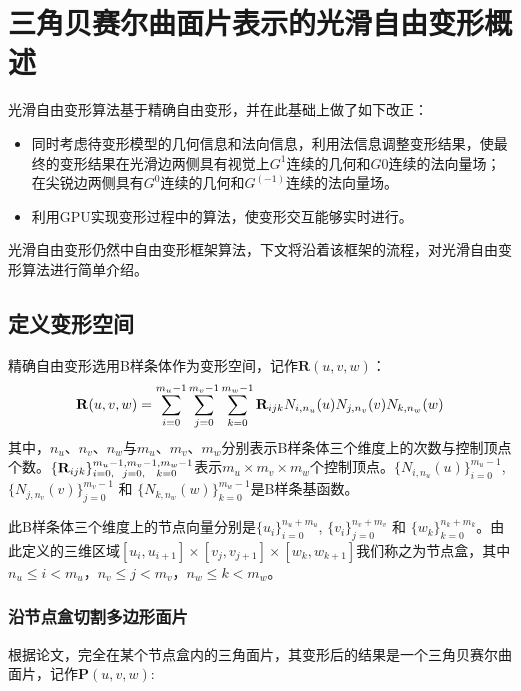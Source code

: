 
\chapter{三角贝赛尔曲面片表示的光滑自由变形概述}
光滑自由变形算法基于精确自由变形\cite{Feng98}，并在此基础上做了如下改正：

\begin{itemize}
        \item 同时考虑待变形模型的几何信息和法向信息，利用法信息调整变形结果，使最终的变形结果在光滑边两侧具有视觉上$G^1$连续的几何和$G0$连续的法向量场；在尖锐边两侧具有$G^0$连续的几何和$G^(-1)$连续的法向量场。
        \item 利用GPU实现变形过程中的算法，使变形交互能够实时进行。
\end{itemize}

光滑自由变形仍然中自由变形框架算法，下文将沿着该框架的流程，对光滑自由变形算法进行简单介绍。

\section{定义变形空间}
精确自由变形选用B样条体作为变形空间，记作$\mathbf R(u,v,w)$：
\begin{equation}
	\footnotesize
	{\mathbf R}(u,v,w) 
	= \sum_{i=0}^{m_u-1}\sum_{j=0}^{m_v-1}\sum_{k=0}^{m_w-1} {\mathbf
	R}_{ijk}N_{i,n_u}(u)N_{j,n_v}(v)N_{k,n_w}(w)
	\label{equ:Ruvw}
\end{equation}
其中，$n_u$、$n_v$、$n_w$与$m_u$、$m_v$、$m_w$分别表示B样条体三个维度上的次数与控制顶点个数。$\{\mathbf R_{ijk}\}_{i=0,\hspace{6 pt} j=0,\hspace{8 pt} k=0}^{m_u-1,m_v-1,m_w-1}$表示$m_u\times m_v\times m_w$个控制顶点。$\{N_{i,n_u}(u)\}_{i=0}^{m_u-1}$, $\{N_{j,n_v}(v)\}_{j=0}^{m_v-1}$ 和 $\{N_{k,n_w}(w)\}_{k=0}^{m_w-1}$是B样条基函数。

此B样条体三个维度上的节点向量分别是$\{u_i\}^{n_u+m_u}_{i=0}$, $\{v_i\}^{n_v+m_v}_{j=0}$ 和 $\{w_k\}^{n_k+m_k}_{k=0}$。由此定义的三维区域$[u_i, u_{i+1}] \times [v_j, v_{j+1}] \times [w_k, w_{k+1}]$我们称之为节点盒，其中$n_u\leq i < m_u$，$n_v\leq j < m_v$，$n_w\leq k < m_w$。

\subsection{沿节点盒切割多边形面片}
根据论文\cite{Feng98, Feng00}，完全在某个节点盒内的三角面片，其变形后的结果是一个三角贝赛尔曲面片，记作${\mathbf P}(u,v,w)$:\label{section:split}

